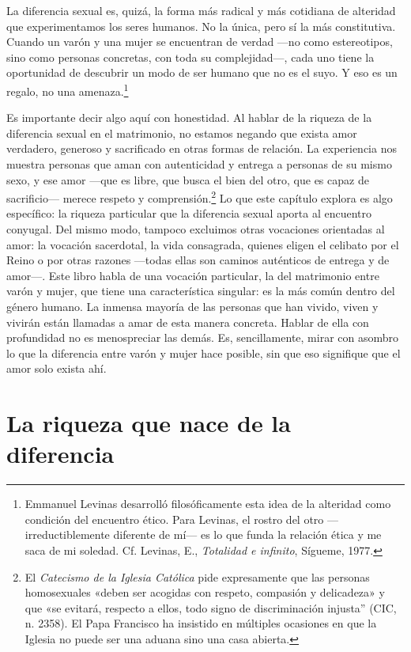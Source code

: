 La diferencia sexual es, quizá, la forma más radical y más cotidiana de alteridad que experimentamos los seres humanos. No la única, pero sí la más constitutiva. Cuando un varón y una mujer se encuentran de verdad ---no como estereotipos, sino como personas concretas, con toda su complejidad---, cada uno tiene la oportunidad de descubrir un modo de ser humano que no es el suyo. Y eso es un regalo, no una amenaza.\footnote{Emmanuel Levinas desarrolló filosóficamente esta idea de la alteridad como condición del encuentro ético. Para Levinas, el rostro del otro ---irreductiblemente diferente de mí--- es lo que funda la relación ética y me saca de mi soledad. Cf. Levinas, E., \textit{Totalidad e infinito}, Sígueme, 1977.}

Es importante decir algo aquí con honestidad. Al hablar de la riqueza de la diferencia sexual en el matrimonio, no estamos negando que exista amor verdadero, generoso y sacrificado en otras formas de relación. La experiencia nos muestra personas que aman con autenticidad y entrega a personas de su mismo sexo, y ese amor ---que es libre, que busca el bien del otro, que es capaz de sacrificio--- merece respeto y comprensión.\footnote{El \textit{Catecismo de la Iglesia Católica} pide expresamente que las personas homosexuales «deben ser acogidas con respeto, compasión y delicadeza» y que «se evitará, respecto a ellos, todo signo de discriminación injusta'' (CIC, n. 2358). El Papa Francisco ha insistido en múltiples ocasiones en que la Iglesia no puede ser una aduana sino una casa abierta.} Lo que este capítulo explora es algo específico: la riqueza particular que la diferencia sexual aporta al encuentro conyugal. Del mismo modo, tampoco excluimos otras vocaciones orientadas al amor: la vocación sacerdotal, la vida consagrada, quienes eligen el celibato por el Reino o por otras razones ---todas ellas son caminos auténticos de entrega y de amor---. Este libro habla de una vocación particular, la del matrimonio entre varón y mujer, que tiene una característica singular: es la más común dentro del género humano. La inmensa mayoría de las personas que han vivido, viven y vivirán están llamadas a amar de esta manera concreta. Hablar de ella con profundidad no es menospreciar las demás. Es, sencillamente, mirar con asombro lo que la diferencia entre varón y mujer hace posible, sin que eso signifique que el amor solo exista ahí.

\section{La riqueza que nace de la diferencia}

